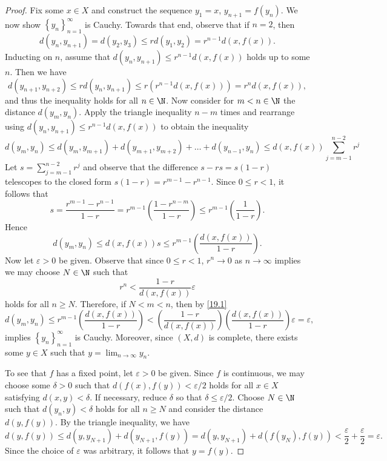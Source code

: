 \documentclass[12pt]{amsart}
\begin{document}
\begin{setup}
\begin{proof}
    Fix some $x \in X$ and construct the sequence $y_1 = x$, $y_{n+1} = f(y_n)$.
    We now show $\left\{y_n\right\}_{n=1}^\infty$ is Cauchy.
    Towards that end, observe that if $n=2$, then 
    $$d(y_n, y_{n+1}) = d(y_2, y_3) \leq rd(y_1, y_2) = r^{n-1}d(x,f(x)).$$
    Inducting on $n$, assume that $d(y_n, y_{n+1}) \leq r^{n-1} d(x,f(x))$ holds up to some $n$.
    Then we have $$d\left(y_{n+1}, y_{n+2}\right) \leq r d\left(y_n, y_{n+1}\right) \leq r\left(r^{n-1}d\left(x, f\left(x\right)\right)\right) = r^n d\left(x, f\left(x\right)\right),$$
    and thus the inequality holds for all $n \in \N$.
    Now consider for $m < n \in \N$ the distance $d\left(y_m, y_n\right)$.
    Apply the triangle inequality $n-m$ times and rearrange using $d(y_n, y_{n+1}) \leq r^{n-1} d\left(x,f\left(x\right)\right)$ to obtain the inequality 
    $$d(y_m, y_n) \leq d(y_m, y_{m+1}) + d(y_{m+1}, y_{m+2}) + \ldots + d(y_{n-1}, y_n) \leq d(x,f(x)) \sum_{j=m-1}^{n-2}r^j$$
    Let $s = \sum_{j=m-1}^{n-2}r^j$ and observe that the difference $s - rs = s(1-r)$ telescopes to the closed form $s(1-r) = r^{m-1} - r^{n-1}$. 
    Since $0 \leq r < 1$, it follows that  $$s = \frac{r^{m-1} - r^{n-1}}{1-r} = r^{m-1}\left(\frac{1 - r^{n-m}}{1-r}\right) \leq r^{m-1}\left(\frac{1}{1-r}\right).$$ 
    Hence %
    \begin{equation}\label{19.1}
      d(y_m, y_n) \leq d(x,f(x))s \leq r^{m-1}\left(\frac{d(x,f(x))}{1-r}\right).
    \end{equation}
    Now let $\varepsilon > 0$ be given.
    Observe that since $0 \leq r < 1$, $r^n \rightarrow 0$ as $n \rightarrow \infty$ implies we may choose $N \in \N$ such that 
    $$r^{n} < \frac{1-r}{d(x,f(x))}\varepsilon$$
    holds for all $n \geq N$.
    Therefore, if $N < m < n$, then by \eqref{19.1}
    $$d(y_m, y_n) \leq r^{m-1}\left(\frac{d(x,f(x))}{1-r}\right) < \left(\frac{1-r}{d(x,f(x))}\right)\left(\frac{d(x,f(x))}{1-r}\right)\varepsilon = \varepsilon,$$
    implies $\left\{y_n\right\}_{n=1}^{\infty}$ is Cauchy.
    Moreover, since $(X,d)$ is complete, there exists some $y \in X$ such that $y = \lim_{n \rightarrow \infty} y_n$.
    
    To see that $f$ has a fixed point, let $\varepsilon > 0$ be given.
    Since $f$ is continuous, we may choose some $\delta > 0$ such that $d(f(x), f(y)) < \varepsilon/2$ holds for all $x \in X$ satisfying $d(x,y) < \delta$.
    If necessary, reduce $\delta$ so that $\delta \leq \varepsilon/2$.
    Choose $N \in \N$ such that $d(y_n, y) < \delta$ holds for all $n \geq N$ and consider the distance $d(y,f(y))$.
    By the triangle inequality, we have 
    $$d(y, f(y)) \leq d(y, y_{N+1}) + d(y_{N+1}, f(y)) = d(y, y_{N+1}) + d(f(y_N), f(y))< \frac{\varepsilon}{2} + \frac{\varepsilon}{2} = \varepsilon.$$
    Since the choice of $\varepsilon$ was arbitrary, it follows that $y = f(y)$.
    

\end{proof}
\end{setup}
\end{document}
